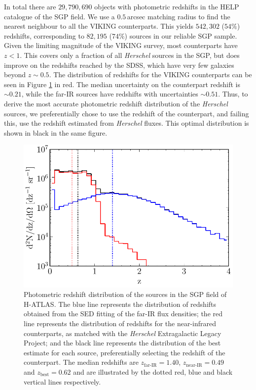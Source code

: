 In total there are $29,790,690$ objects with photometric redshifts in the HELP catalogue of the SGP field. We use a $0.5\,$arcsec matching radius to find the nearest neighbour to all the VIKING counterparts. This yields $542,302$ ($54\%$) redshifts, corresponding to $82,195$ ($74\%$) sources in our reliable SGP sample. Given the limiting magnitude of the VIKING survey, most counterparts have $z < 1$. This covers only a fraction of all \textit{Herschel} sources in the SGP, but does improve on the redshifts reached by the SDSS, which have very few galaxies beyond $z \sim 0.5$. The distribution of redshifts for the VIKING counterparts can be seen in Figure \ref{fig:redshift_distribution} in red. The median uncertainty on the counterpart redshift is $\sim 0.21$, while the far-IR sources have redshifts with uncertainties $\sim 0.51$. Thus, to derive the most accurate photometric redshift distribution of the \textit{Herschel} sources, we preferentially chose to use the redshift of the counterpart, and failing this, use the redshift estimated from \textit{Herschel} fluxes. This optimal distribution is shown in black in the same figure.

\begin{figure}
    \centering
    \includegraphics[width=0.8\columnwidth]{Figures/redshift_distribution.pdf}
    \caption[Photometric redshift distribution of SGP sources]{Photometric redshift distribution of the sources in the SGP field of H-ATLAS. The blue line represents the distribution of redshifts obtained from the SED fitting of the far-IR flux densities; the red line represents the distribution of redshifts for the near-infrared counterparts, as matched with the \textit{Herschel} Extragalactic Legacy Project; and the black line represents the distribution of the best estimate for each source, preferentially selecting the redshift of the counterpart. The median redshifts are $z_{\textrm{far-IR}} = 1.40$, $z_{\textrm{near-IR}} = 0.49$ and $z_{\textrm{best}} = 0.62$ and are illustrated by the dotted red, blue and black vertical lines respectively.}
    \label{fig:redshift_distribution}
\end{figure}

